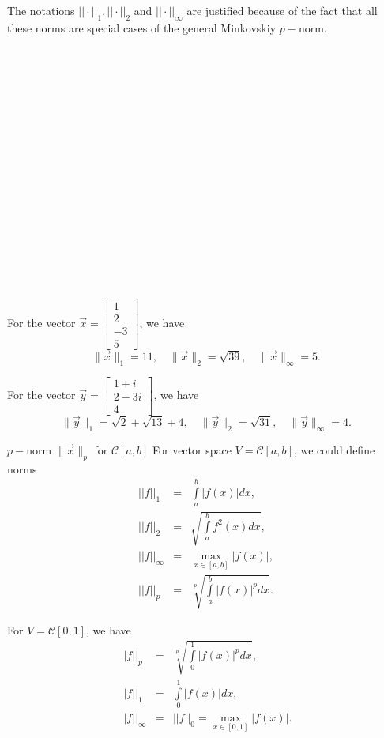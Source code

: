 The notations $||\cdot ||_1, ||\cdot||_2$ and $||\cdot ||_\infty$ are justified because of the fact that all these norms are special cases of the general Minkovskiy $p-$norm.
~\\~\\~\\~\\~\\~\\~\\~\\~\\~\\~\\~\\~\\~\\~\\~\\~\\~\\
\Ex For the vector $\vec{x} = \begin{bmatrix}
    1 \\
    2 \\ 
    -3 \\
    5
\end{bmatrix}$, we have
\[
    \|\vec{x}\|_1 = 11, \quad \|\vec{x}\|_2 = \sqrt{39}, \quad 
    \|\vec{x}\|_\infty = 5.
\]

For the vector $\vec{y} = \begin{bmatrix}
    1+i \\
    2-3i\\
    4
\end{bmatrix}$, we have
\[
    \|\vec{y}\|_1 = \sqrt{2} + \sqrt{13} + 4, \quad \|\vec{y}\|_2 = \sqrt{31}, \quad \|\vec{y}\|_\infty = 4.  
\]

\begin{definition}{$p-$norm $\|\vec{x}\|_p$ for $\mathcal{C}[a,b]$}{}
    For vector space $V=\mathcal{C}[a,b]$, we could define norms 
    \begin{eqnarray} 
        ||f||_1 &=& \int\limits_{a}^b |f(x)| dx,\nonumber\\
        ||f||_2 &=& \sqrt{\int\limits_a^b f^2(x)dx},\nonumber\\
        ||f||_\infty &=& \max\limits_{x\in [a,b]} |f(x)|,\nonumber\\
        ||f||_p &=& \sqrt[p]{\int\limits_{a}^b |f(x)|^p dx}. \nonumber
    \end{eqnarray}
\end{definition}

\Ex For $V = \mathcal{C}[0,1]$, we have
\begin{eqnarray}
        \displaystyle ||f||_p &=& \sqrt[p]{\int\limits_{0}^1 |f(x)|^p dx},  \nonumber\\
        \displaystyle ||f||_1 &=& \int\limits_{0}^1 |f(x)| dx,\nonumber\\
        \displaystyle ||f||_\infty &=& \displaystyle ||f||_0 =\max\limits_{x \in [0,1]} |f(x)|.\nonumber
\end{eqnarray}

